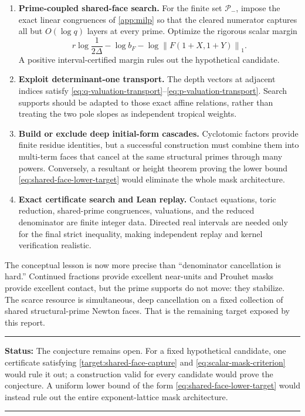 \documentclass[11pt,oneside]{article}
\theoremstyle{definition}
\theoremstyle{remark}
\newcommand{\normone}[1]{\left\lVert #1\right\rVert_1}
\newenvironment{statusbox}[1]
{\begin{center}\begin{minipage}{0.94\textwidth}\raggedright\hrule\vspace{0.45em}
\textbf{Status:} #1\par\vspace{0.35em}}
{\vspace{0.35em}\hrule\end{minipage}\end{center}}
\begin{document}
\begin{enumerate}
\item \textbf{Prime-coupled shared-face search.}
  For the finite set $\mathcal P_-$, impose the exact linear congruences of
  \cref{app:milp} so that the cleared numerator captures all but $O(\log q)$ layers at every
  prime.  Optimize the rigorous scalar margin
  \[
   r\log\frac1{2\Delta}
   -\log b_F
   -\log\normone{F(1+X,1+Y)}.
  \]
  A positive interval-certified margin rules out the hypothetical candidate.

\item \textbf{Exploit determinant-one transport.}
  The depth vectors at adjacent indices satisfy
  \eqref{eq:q-valuation-transport}--\eqref{eq:p-valuation-transport}.  Search supports should
  be adapted to those exact affine relations, rather than treating the two pole slopes as
  independent tropical weights.

\item \textbf{Build or exclude deep initial-form cascades.}
  Cyclotomic factors provide finite residue identities, but a successful construction must
  combine them into multi-term faces that cancel at the same structural primes through many
  powers.  Conversely, a resultant or height theorem proving the lower bound
  \eqref{eq:shared-face-lower-target} would eliminate the whole mask architecture.

\item \textbf{Exact certificate search and Lean replay.}
  Contact equations, toric reduction, shared-prime congruences, valuations, and the reduced
  denominator are finite integer data.  Directed real intervals are needed only for the final
  strict inequality, making independent replay and kernel verification realistic.
\end{enumerate}

The conceptual lesson is now more precise than ``denominator cancellation is hard.''
Continued fractions provide excellent near-units and Prouhet masks provide excellent contact,
but the prime supports do not move: they stabilize.  The scarce resource is simultaneous,
deep cancellation on a fixed collection of shared structural-prime Newton faces.  That is the
remaining target exposed by this report.

\begin{statusbox}{The conjecture remains open.  For a fixed hypothetical candidate, one
certificate satisfying \cref{target:shared-face-capture} and
\eqref{eq:scalar-mask-criterion} would rule it out; a construction valid for every candidate
would prove the conjecture.  A uniform lower bound of the form
\eqref{eq:shared-face-lower-target} would instead rule out the entire exponent-lattice mask
architecture.}
\end{statusbox}
\end{document}
